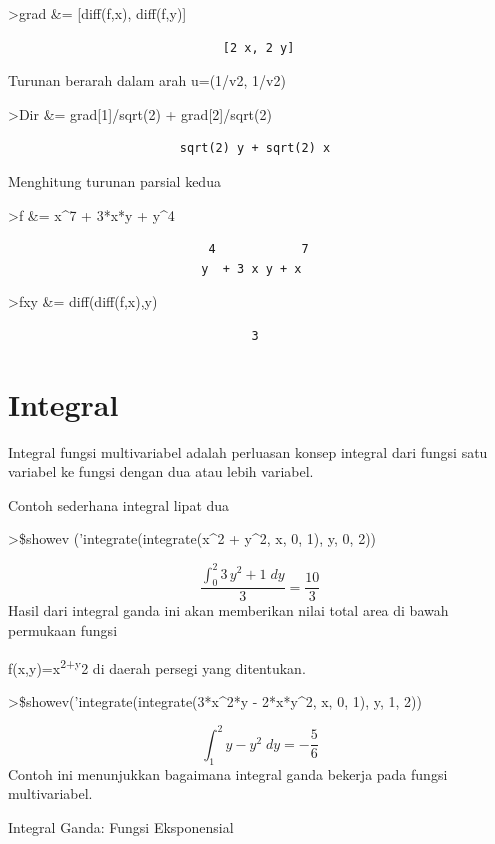\documentclass[
]{book}
\begin{document}
\textgreater grad \&= {[}diff(f,x), diff(f,y){]}

\begin{verbatim}
                              [2 x, 2 y]
\end{verbatim}

Turunan berarah dalam arah u=(1/v2, 1/v2)

\textgreater Dir \&= grad{[}1{]}/sqrt(2) + grad{[}2{]}/sqrt(2)

\begin{verbatim}
                        sqrt(2) y + sqrt(2) x
\end{verbatim}

Menghitung turunan parsial kedua

\textgreater f \&= x\^{}7 + 3*x*y + y\^{}4

\begin{verbatim}
                            4            7
                           y  + 3 x y + x
\end{verbatim}

\textgreater fxy \&= diff(diff(f,x),y)

\begin{verbatim}
                                  3
\end{verbatim}

\chapter{Integral}\label{integral}

Integral fungsi multivariabel adalah perluasan konsep integral dari fungsi satu variabel ke fungsi dengan dua atau lebih variabel.

Contoh sederhana integral lipat dua

\textgreater\$showev ('integrate(integrate(x\^{}2 + y\^{}2, x, 0, 1), y, 0, 2))

\[\frac{\int_{0}^{2}{3\,y^2+1\;dy}}{3}=\frac{10}{3}\]Hasil dari integral ganda ini akan memberikan nilai total area di bawah permukaan fungsi

f(x,y)=x\textsuperscript{2+y}2 di daerah persegi yang ditentukan.

\textgreater\$showev('integrate(integrate(3*x\^{}2*y - 2*x*y\^{}2, x, 0, 1), y, 1, 2))

\[\int_{1}^{2}{y-y^2\;dy}=-\frac{5}{6}\]Contoh ini menunjukkan bagaimana integral ganda bekerja pada fungsi multivariabel.

Integral Ganda: Fungsi Eksponensial
\end{document}
